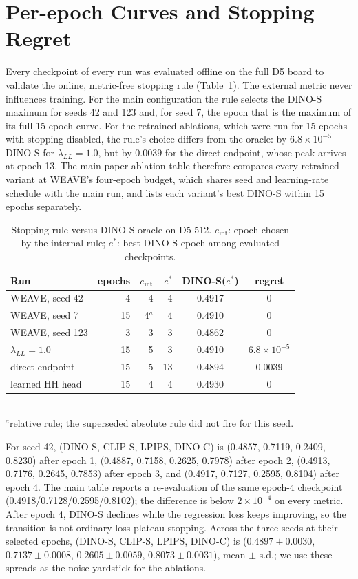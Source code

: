 \documentclass[conference]{IEEEtran}
\newcommand{\dinos}{DINO-S}
\newcommand{\dinoc}{DINO-C}
\newcommand{\clips}{CLIP-S}
\begin{document}
\section{Per-epoch Curves and Stopping Regret}
\label{sec:curves}

Every checkpoint of every run was evaluated offline on the full D5 board to validate the online,
metric-free stopping rule (Table~\ref{tab:regret}). The external metric never influences
training. For the main configuration the rule selects the \dinos{} maximum for seeds 42 and 123
and, for seed 7, the epoch that is the maximum of its full 15-epoch curve. For the retrained
ablations, which were run for 15 epochs with stopping disabled, the rule's choice differs from the
oracle: by $6.8\times10^{-5}$ \dinos{} for $\lambda_{LL}=1.0$, but by $0.0039$ for the direct
endpoint, whose peak arrives at epoch 13. The main-paper ablation table therefore compares every
retrained variant at WEAVE's four-epoch budget, which shares seed and learning-rate schedule with the
main run, and lists each variant's best \dinos{} within 15 epochs separately.

\begin{table}[t]
\centering
\caption{Stopping rule versus \dinos{} oracle on D5-512. $e_{\mathrm{int}}$: epoch chosen by the
internal rule; $e^\ast$: best \dinos{} epoch among evaluated checkpoints.}
\label{tab:regret}
\footnotesize
\setlength{\tabcolsep}{3pt}
\begin{tabular}{@{}lrrrcc@{}}
\toprule
Run & epochs & $e_{\mathrm{int}}$ & $e^\ast$ & \dinos($e^\ast$) & regret \\
\midrule
WEAVE, seed 42 & 4 & 4 & 4 & 0.4917 & 0 \\
WEAVE, seed 7 & 15 & 4$^a$ & 4 & 0.4910 & 0 \\
WEAVE, seed 123 & 3 & 3 & 3 & 0.4862 & 0 \\
$\lambda_{LL}=1.0$ & 15 & 5 & 3 & 0.4910 & $6.8\!\times\!10^{-5}$ \\
direct endpoint & 15 & 5 & 13 & 0.4894 & 0.0039 \\
learned HH head & 15 & 4 & 4 & 0.4930 & 0 \\
\bottomrule
\end{tabular}\\[2pt]
{\scriptsize $^a$relative rule; the superseded absolute rule did not fire for this seed.}
\end{table}

For seed 42, (\dinos, \clips, LPIPS, \dinoc) is (0.4857, 0.7119, 0.2409, 0.8230) after epoch 1,
(0.4887, 0.7158, 0.2625, 0.7978) after epoch 2, (0.4913, 0.7176, 0.2645, 0.7853) after epoch 3, and
(0.4917, 0.7127, 0.2595, 0.8104) after epoch 4. The main table reports a
re-evaluation of the same epoch-4 checkpoint (0.4918/0.7128/0.2595/0.8102); the difference is
below $2\times10^{-4}$ on every metric. After epoch 4, \dinos{} declines while the regression
loss keeps improving, so the transition is not ordinary loss-plateau stopping. Across the three
seeds at their selected epochs, (\dinos, \clips, LPIPS, \dinoc) is ($0.4897\pm0.0030$,
$0.7137\pm0.0008$, $0.2605\pm0.0059$, $0.8073\pm0.0031$), mean $\pm$ s.d.; we use these spreads as
the noise yardstick for the ablations.
\end{document}
